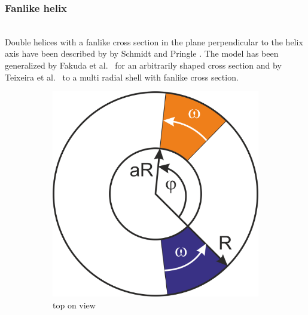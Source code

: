 \subsubsection{Fanlike helix} ~\\
Double helices with a fanlike cross section in the plane perpendicular to the helix axis have been described by by Schmidt and Pringle \cite{Schmidt1970,Pringle1971}. The model has been generalized by Fakuda et al.\ \cite{Fukuda2002} for an arbitrarily shaped cross section and by Teixeira et al.\ \cite{Teixeira2010} to a multi radial shell with fanlike cross section.
\begin{figure}[htb]
\begin{subfigure}[b]{.48\textwidth}
   \centering
   \includegraphics[width=1\textwidth]{../images/form_factor/cylindrical_obj/fanlike_helicesXS.png}
   \caption{top on view}
   \label{fig:fanhelixside1}
\end{subfigure}
\hfill
\begin{subfigure}[b]{.48\textwidth}
   \centering

\end{subfigure}
\end{figure}
